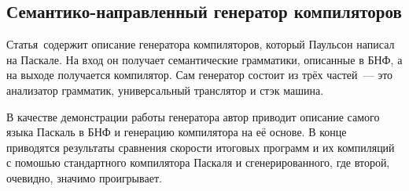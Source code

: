 \subsection{Семантико-направленный генератор компиляторов} \label{subsection_Paulson1982}
Статья\,\cite{Paulson1982} содержит описание генератора компиляторов, который Паульсон написал на Паскале. На вход он получает семантические грамматики, описанные в БНФ, а на выходе получается компилятор. Сам генератор состоит из трёх частей~--- это анализатор грамматик, универсальный транслятор и стэк машина. 

В качестве демонстрации работы генератора автор приводит описание самого языка Паскаль в БНФ и генерацию компилятора на её основе. В конце приводятся результаты сравнения скорости итоговых программ и их компиляций с помошью стандартного компилятора Паскаля и сгенерированного, где второй, очевидно, значимо проигрывает.


